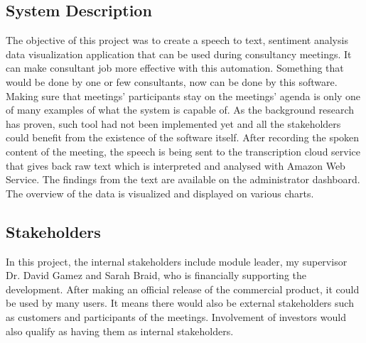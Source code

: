 \documentclass{article}
\begin{document}
\subsection{System Description}
{\large 
The objective of this project was to create a speech to text, sentiment analysis data visualization application that can be used during consultancy meetings. It can make consultant job more effective with this automation. Something that would be done by one or few consultants, now can be done by this software. Making sure that meetings' participants stay on the meetings' agenda is only one of many examples of what the system is capable of. As the background research has proven, such tool had not been implemented yet and all the stakeholders could benefit from the existence of the software itself. After recording the spoken content of the meeting, the speech is being sent to the transcription cloud service that gives back raw text which is interpreted and analysed with Amazon Web Service. The findings from the text are available on the administrator dashboard. The overview of the data is visualized and displayed on various charts.\par
}

\subsection{Stakeholders}
{\large 
In this project, the internal stakeholders include module leader, my supervisor Dr. David Gamez and Sarah Braid, who is financially supporting the development. After making an official release of the commercial product, it could be used by many users. It means there would also be external stakeholders such as customers and participants of the meetings. Involvement of investors would also qualify as having them as internal stakeholders.\par
}

\newpage
\end{document}
